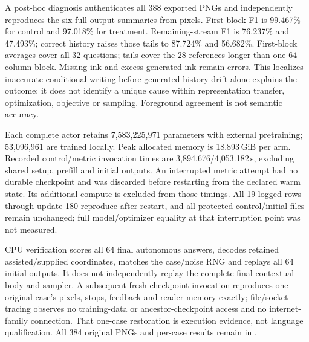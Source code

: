 \documentclass[10pt,a4paper]{article}
\begin{document}
A post-hoc diagnosis authenticates all 388 exported PNGs and independently
reproduces the six full-output summaries from pixels. First-block F1 is
99.467\% for control and 97.018\% for treatment. Remaining-stream F1 is
76.237\% and 47.493\%; correct history raises those tails to 87.724\% and
56.682\%. First-block averages cover all 32 questions; tails cover the 28
references longer than one 64-column block. Missing ink and excess generated
ink remain errors. This localizes inaccurate conditional writing before
generated-history drift alone explains the outcome; it does not identify a
unique cause within representation transfer, optimization, objective or
sampling. Foreground agreement is not semantic accuracy.

Each complete actor retains 7,583,225,971 parameters with external pretraining;
53,096,961 are trained locally. Peak allocated memory is 18.893\,GiB per arm.
Recorded control/metric invocation times are 3,894.676/4,053.182\,s, excluding
shared setup, prefill and initial outputs. An interrupted metric attempt had
no durable checkpoint and was discarded before restarting from the declared
warm state. Its additional compute is excluded from those timings. All
19 logged rows through update 180 reproduce after restart, and all protected
control/initial files remain unchanged; full model/optimizer equality at
that interruption point was not measured.

CPU verification scores all 64 final autonomous answers, decodes retained
assisted/supplied coordinates, matches the case/noise RNG and replays all
64 initial outputs. It does not independently replay the complete final
contextual body and sampler. A subsequent fresh checkpoint invocation
reproduces one original case's pixels, stops, feedback and reader memory
exactly; file/socket tracing observes no training-data or ancestor-checkpoint
access and no internet-family connection. That one-case restoration is
execution evidence, not language qualification. All 384 original PNGs and
per-case results remain in
.

\end{document}
